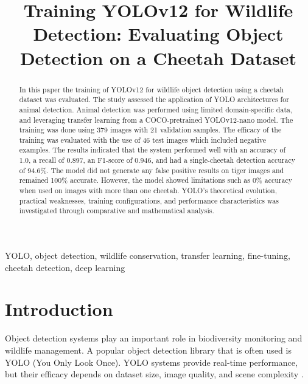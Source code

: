 \documentclass[conference]{IEEEtran}
\begin{document}
\onehalfspacing

\title{Training YOLOv12 for Wildlife Detection: Evaluating Object Detection on a Cheetah Dataset}

\author{
}

\maketitle

\begin{abstract}
In this paper the training of YOLOv12 for wildlife object detection using a cheetah dataset was evaluated. The study assessed the application of YOLO architectures for animal detection. Animal detection was performed using limited domain-specific data, and leveraging transfer learning from a COCO-pretrained YOLOv12-nano model. The training was done using 379 images with 21 validation samples. The efficacy of the training was evaluated with the use of 46 test images which included negative examples. The results indicated that the system performed well with an accuracy of 1.0, a recall of 0.897, an F1-score of 0.946, and had a single-cheetah detection accuracy of 94.6\%. The model did not generate any false positive results on tiger images and remained 100\% accurate. However, the model showed limitations such as 0\% accuracy when used on images with more than one cheetah. YOLO's theoretical evolution, practical weaknesses, training configurations, and performance characteristics was investigated through comparative and mathematical analysis.
\end{abstract}

\begin{IEEEkeywords}
YOLO, object detection, wildlife conservation, transfer learning, fine-tuning, cheetah detection, deep learning
\end{IEEEkeywords}

\section{Introduction}

Object detection systems play an important role in biodiversity monitoring and wildlife management. A popular object detection library that is often used is YOLO (You Only Look Once). YOLO systems provide real-time performance, but their efficacy depends on dataset size, image quality, and scene complexity \cite{b3}.
\end{document}
